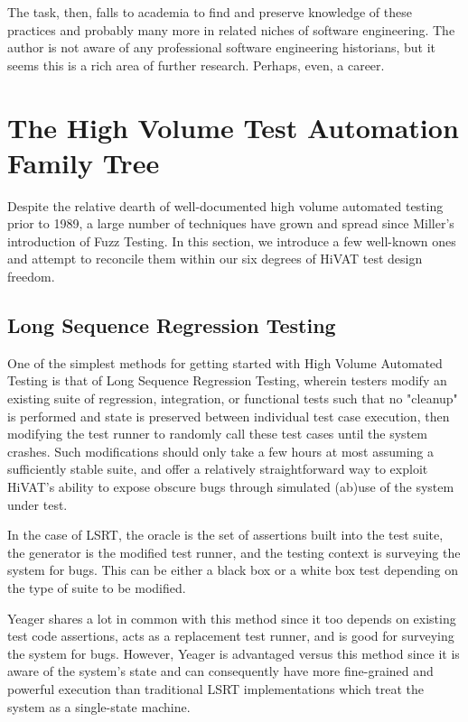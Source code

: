 The task, then, falls to academia to find and preserve knowledge of these practices and probably many more in related niches of software engineering. The author is not aware of any professional software engineering historians, but it seems this is a rich area of further research. Perhaps, even, a career.

\section{The High Volume Test Automation Family Tree}
Despite the relative dearth of well-documented high volume automated testing prior to 1989, a large number of techniques have grown and spread since Miller's introduction of Fuzz Testing. In this section, we introduce a few well-known ones and attempt to reconcile them within our six degrees of HiVAT test design freedom.

\subsection{Long Sequence Regression Testing}
One of the simplest methods for getting started with High Volume Automated Testing is that of Long Sequence Regression Testing, wherein testers modify an existing suite of regression, integration, or functional tests such that no "cleanup" is performed and state is preserved between individual test case execution, then modifying the test runner to randomly call these test cases until the system crashes. Such modifications should only take a few hours at most assuming a sufficiently stable suite, and offer a relatively straightforward way to exploit HiVAT's ability to expose obscure bugs through simulated (ab)use of the system under test.

In the case of LSRT, the oracle is the set of assertions built into the test suite, the generator is the modified test runner, and the testing context is surveying the system for bugs. This can be either a black box or a white box test depending on the type of suite to be modified.

Yeager shares a lot in common with this method since it too depends on existing test code assertions, acts as a replacement test runner, and is good for surveying the system for bugs. However, Yeager is advantaged versus this method since it is aware of the system's state and can consequently have more fine-grained and powerful execution than traditional LSRT implementations which treat the system as a single-state machine.

